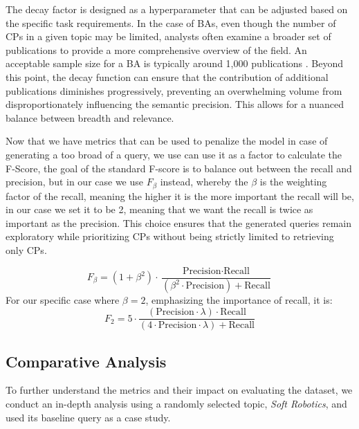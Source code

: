 The decay factor is designed as a hyperparameter that can be adjusted based on the specific task requirements. In the case of BAs, even though the number of CPs in a given topic may be limited, analysts often examine a broader set of publications to provide a more comprehensive overview of the field. An acceptable sample size for a BA is typically around 1,000 publications \autocite{Rogers2020}. Beyond this point, the decay function can ensure that the contribution of additional publications diminishes progressively, preventing an overwhelming volume from disproportionately influencing the semantic precision. This allows for a nuanced balance between breadth and relevance.

Now that we have metrics that can be used to penalize the model in case of generating a too broad of a query, we use can use it as a factor to calculate the F-Score, the goal of the standard F-score is to balance out between the recall and precision, but in our case we use $F_\beta$ instead, whereby the $\beta$ is the weighting factor of the recall, meaning the higher it is the more important the recall will be, in our case we set it to be 2, meaning that we want the recall is twice as important as the precision. This choice ensures that the generated queries remain exploratory while prioritizing CPs without being strictly limited to retrieving only CPs.

\begin{equation}\label{eq:f-beta}
F_\beta = (1 + \beta^2) \cdot \frac{\text{Precision} \cdot \text{Recall}}{(\beta^2 \cdot \text{Precision}) + \text{Recall}}
\end{equation}
For our specific case where $\beta = 2$, emphasizing the importance of recall, it is:
\[
	F_2 = 5 \cdot \frac{(\text{Precision} \cdot \lambda) \cdot \text{Recall}}{(4 \cdot \text{Precision}\cdot \lambda) + \text{Recall}}
\]

\subsection*{Comparative Analysis}
To further understand the metrics and their impact on evaluating the dataset, we conduct an in-depth analysis using a randomly selected topic, \textit{Soft Robotics}, and used its baseline query as a case study.

